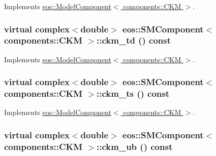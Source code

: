 Implements \hyperlink{classeos_1_1ModelComponent_3_01components_1_1CKM_01_4_a047bf55d51bf31e6b3a00777e7986613}{eos::ModelComponent$<$ components::CKM $>$}.\hypertarget{classeos_1_1SMComponent_3_01components_1_1CKM_01_4_a5962bd89ee4206447b52dfe2d503e9fb}{
\subsubsection[{ckm\_\-td}]{\setlength{\rightskip}{0pt plus 5cm}virtual complex$<$double$>$ eos::SMComponent$<$ components::CKM $>$::ckm\_\-td () const}}
\label{classeos_1_1SMComponent_3_01components_1_1CKM_01_4_a5962bd89ee4206447b52dfe2d503e9fb}


Implements \hyperlink{classeos_1_1ModelComponent_3_01components_1_1CKM_01_4_a4bcd2be1cd84c0b6ea86ded723477094}{eos::ModelComponent$<$ components::CKM $>$}.\hypertarget{classeos_1_1SMComponent_3_01components_1_1CKM_01_4_a8b1562be6dd88747f3a0cb59c1679d8e}{
\subsubsection[{ckm\_\-ts}]{\setlength{\rightskip}{0pt plus 5cm}virtual complex$<$double$>$ eos::SMComponent$<$ components::CKM $>$::ckm\_\-ts () const}}
\label{classeos_1_1SMComponent_3_01components_1_1CKM_01_4_a8b1562be6dd88747f3a0cb59c1679d8e}


Implements \hyperlink{classeos_1_1ModelComponent_3_01components_1_1CKM_01_4_a94edc4a96770b9a16e078c483670ecc3}{eos::ModelComponent$<$ components::CKM $>$}.\hypertarget{classeos_1_1SMComponent_3_01components_1_1CKM_01_4_a8f787b6796f087fb64d1349c564fd72d}{
\subsubsection[{ckm\_\-ub}]{\setlength{\rightskip}{0pt plus 5cm}virtual complex$<$double$>$ eos::SMComponent$<$ components::CKM $>$::ckm\_\-ub () const}}
\label{classeos_1_1SMComponent_3_01components_1_1CKM_01_4_a8f787b6796f087fb64d1349c564fd72d}



